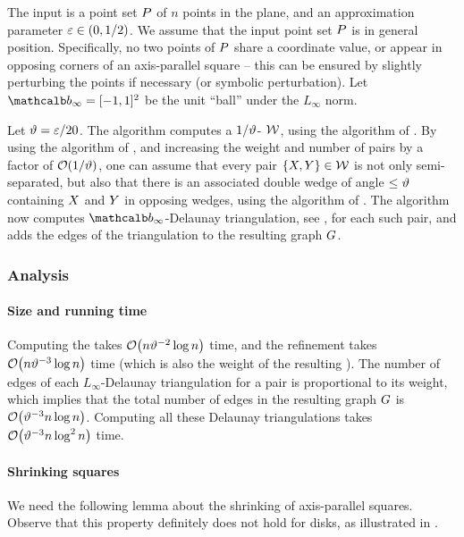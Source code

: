 \documentclass[12pt]{article}%
\begin{document}
The input is a point set $P$ of $n$ points in the plane, and an
approximation parameter $\varepsilon \in (0,1/2)$.  We assume that the input
point set $P$ is in general position. Specifically, no two points of
$P$ share a coordinate value, or appear in opposing corners of an
axis-parallel square -- this can be ensured by slightly perturbing the
points if necessary (or symbolic perturbation). Let
$\Binfty = [-1,1]^2$ be the unit ``ball'' under the $L_\infty$
norm.

Let $\vartheta = \varepsilon/20$.  The algorithm computes a $1/\vartheta$-\SSPD
$\mathcal{W}$, using the algorithm of . By using the
algorithm of , and increasing the weight and number
of pairs by a factor of $\mathcal{O}(1/\vartheta)$, one can assume that every pair
$\{ X, Y \} \in \mathcal{W}$ is not only semi-separated, but also that
there is an associated double wedge of angle $\leq \vartheta$ containing
$X$ and $Y$ in opposing wedges, using the algorithm of
.  The algorithm now computes $\Binfty$-Delaunay
triangulation, see , for each such pair, and adds
the edges of the triangulation to the resulting graph $G$.



\subsubsection{Analysis}

\paragraph{Size and running time}

Computing the \SSPD takes $\Of\pth{n \epsA^{-2} \log n}$ time, and the
refinement takes $\Of\pth{n \epsA^{-3} \log n}$ time (which is also
the weight of the resulting \SSPD). The number of edges of each
$L_\infty$-Delaunay triangulation for a pair is proportional to its
weight, which implies that the total number of edges in the resulting
graph $G$ is $\Of\pth{ \epsA^{-3} n\log n}$. Computing all these
Delaunay triangulations takes $\Of\pth{ \epsA^{-3}n \log^2 n}$ time.


\paragraph{Shrinking squares}
We need the following lemma about the shrinking of axis-parallel
squares.  Observe that this property definitely does not hold for
disks, as illustrated in .
\end{document}
